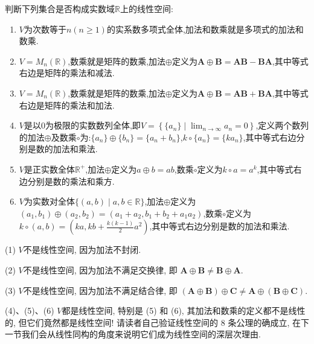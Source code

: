 \documentclass[lang=cn,newtx,10pt,scheme=chinese]{elegantbook}
\begin{document}
\begin{example}\label{example:3.3}
判断下列集合是否构成实数域\(\mathbb{R}\)上的线性空间:
\begin{enumerate}[(1)]
    \item \(V\)为次数等于\(n(n\geq1)\)的实系数多项式全体,加法和数乘就是多项式的加法和数乘.
    \item \(V = M_n(\mathbb{R})\),数乘就是矩阵的数乘,加法\(\oplus\)定义为\(\boldsymbol{A}\oplus\boldsymbol{B}=\boldsymbol{A}\boldsymbol{B}-\boldsymbol{B}\boldsymbol{A}\),其中等式右边是矩阵的乘法和减法.
    \item \(V = M_n(\mathbb{R})\),数乘就是矩阵的数乘,加法\(\oplus\)定义为\(\boldsymbol{A}\oplus\boldsymbol{B}=\boldsymbol{A}\boldsymbol{B}+\boldsymbol{B}\boldsymbol{A}\),其中等式右边是矩阵的乘法和加法.
    \item \label{example:3.3(4)}\(V\)是以\(0\)为极限的实数数列全体,即\(V = \left\{\{a_n\}\mid\lim_{n\rightarrow\infty}a_n = 0\right\}\),定义两个数列的加法\(\oplus\)及数乘\(\circ\)为:\(\{a_n\}\oplus\{b_n\}=\{a_n + b_n\}\),\(k\circ\{a_n\}=\{ka_n\}\),其中等式右边分别是数的加法和乘法.
    \item \label{example:3.3(5)}\(V\)是正实数全体\(\mathbb{R}^+\),加法\(\oplus\)定义为\(a\oplus b = ab\),数乘\(\circ\)定义为\(k\circ a = a^k\),其中等式右边分别是数的乘法和乘方.
    \item \label{example:3.3(6)}\(V\)为实数对全体\(\{(a,b)\mid a,b\in\mathbb{R}\}\),加法\(\oplus\)定义为\((a_1,b_1)\oplus(a_2,b_2)=(a_1 + a_2,b_1 + b_2 + a_1a_2)\),数乘\(\circ\)定义为\(k\circ(a,b)=(ka,kb+\frac{k(k - 1)}{2}a^2)\),其中等式右边分别是数的加法和乘法.
\end{enumerate}
\end{example}
\begin{solution}
(1) \(V\)不是线性空间, 因为加法不封闭.

(2) \(V\)不是线性空间, 因为加法不满足交换律, 即 \(\boldsymbol{A}\oplus\boldsymbol{B}\neq\boldsymbol{B}\oplus\boldsymbol{A}\).

(3) \(V\)不是线性空间, 因为加法不满足结合律, 即 \((\boldsymbol{A}\oplus\boldsymbol{B})\oplus\boldsymbol{C}\neq\boldsymbol{A}\oplus(\boldsymbol{B}\oplus\boldsymbol{C})\).

(4)、(5)、(6) \(V\)都是线性空间, 特别是 (5) 和 (6), 其加法和数乘的定义都不是线性的, 但它们竟然都是线性空间! 请读者自己验证线性空间的 8 条公理的确成立, 在下一节我们会从线性同构的角度来说明它们成为线性空间的深层次理由.
\end{solution}
\end{document}
